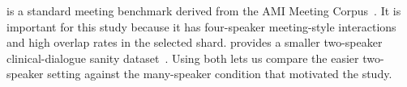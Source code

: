  \amisdm is a standard meeting benchmark derived from the AMI Meeting Corpus~\cite{carletta2006ami}. It is important for this study because it has four-speaker meeting-style interactions and high overlap rates in the selected shard. \simsamu provides a smaller two-speaker clinical-dialogue sanity dataset~\cite{medkit2023simsamu}. Using both lets us compare the easier two-speaker setting against the many-speaker condition that motivated the study.
